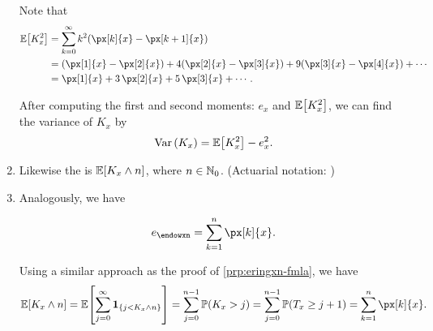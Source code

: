 \begin{enumerate}
\begin{pf}
Note that
\begin{align*}
\expv{K_x^2}
&=\sum_{k=0}^{\infty}k^2(\px[k]{x}-\px[k+1]{x})\\
&=(\px[1]{x}-\px[2]{x})+4(\px[2]{x}-\px[3]{x})+9(\px[3]{x}-\px[4]{x})+\dotsb\\
&=\px[1]{x}+3\,\px[2]{x}+5\,\px[3]{x}+\dotsb.
\end{align*}
\end{pf}

After computing the first and second moments: \(e_x\) and \(\mathbb{E}\qty[K_x^2]\), we
can find the variance of \(K_x\) by
\[
\operatorname{Var}\qty(K_x)=\mathbb{E}\qty[K_x^2]-e_x^2.
\]
\item Likewise the  is \(\mathbb{E}\qty[K_x\wedge
n]\), where \(n\in\mathbb{N}_0\). (Actuarial notation: )
\item Analogously, we have
\begin{proposition}
\label{prp:exn-fmla}
\[
e_{\endowxn}=\sum_{k=1}^{n}\px[k]{x}.
\]
\end{proposition}
\begin{pf}
Using a similar approach as the proof of \cref{prp:eringxn-fmla}, we have
\[
\expv{K_x\wedge n}
=\expv{\sum_{j=0}^{\infty}\indicset{j<K_x \wedge n}}
=\sum_{j=0}^{n-1}\prob{K_x>j}
=\sum_{j=0}^{n-1}\prob{T_x\ge j+1}
=\sum_{k=1}^{n}\px[k]{x}.
\]
\end{pf}
\end{enumerate}
